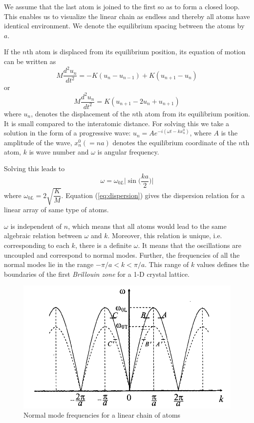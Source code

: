 \documentclass[%
 aip,
 amsmath,amssymb,
 reprint, floatfix%
]{revtex4-1}
\begin{document}
    We assume that the last atom is joined to the first so as to form a closed loop. This enables us to visualize the linear chain as endless and thereby all atoms have identical environment. We denote the equilibrium spacing between the atoms by $a$. 
    \par
    If the $n$th atom is displaced from its equilibrium position, its equation of motion can be written as
    \begin{equation}
        M \dfrac{d^2 u_n}{dt^2} = -K (u_n - u_{n-1}) +K(u_{n+1}-u_n)
    \end{equation}
    or
    \begin{equation}
        M \dfrac{d^2 u_n}{dt^2} = K(u_{n+1}-2u_n+u_{n+1})
    \end{equation}
    where $u_n$, denotes the displacement of the $n$th atom from its equilibrium position. It is small compared to the interatomic distance. For solving this we take a solution in the form of a progressive wave: $u_n = A e^{-i(\omega t-kx_n^0)}$, where $A$ is the amplitude of the wave, $x_n^0(=na)$ denotes the equilibrium coordinate of the $n$th atom, $k$ is wave number and $\omega$ is angular frequency.
    \par
    Solving this leads to
    \begin{equation}
    \label{eq:dispersion}
        \omega = \omega_{0L} \Bigg| \sin \Bigg( \dfrac{ka}{2} \Bigg) \Bigg|
    \end{equation}
    where $\omega_{0L} = 2 \sqrt{\dfrac{K}{M}}$. Equation (\ref{eq:dispersion}) gives the dispersion relation for a linear array of same type of atoms.
    \par
    $\omega$ is independent of $n$, which means that all atoms would lead to the same algebraic relation between $\omega$ and $k$. Moreover, this relation is unique, i.e. corresponding to each $k$, there is a definite $\omega$. It means that the oscillations are uncoupled and correspond to normal modes. Further, the frequencies of all the normal modes lie in the range $-\pi/a < k < \pi/a$. This range of $k$ values defines the boundaries of the first \textit{Brillouin zone} for a 1-D crystal lattice.
    \begin{figure}
        \centering
        \includegraphics[scale = 0.49]{Figures/normalmodes.png}
        \caption{Normal mode frequencies for a linear chain of atoms}
        \label{fig:normalmode}
    \end{figure}
\end{document}
